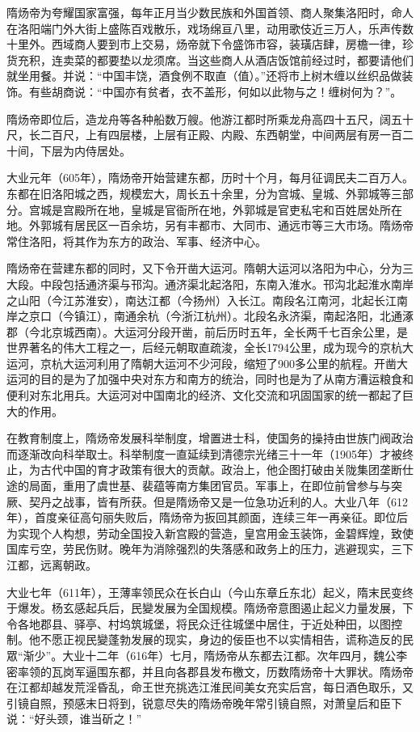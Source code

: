 隋炀帝为夸耀国家富强，每年正月当少数民族和外国首领、商人聚集洛阳时，命人在洛阳端门外大街上盛陈百戏散乐，戏场绵亘八里，动用歌伎近三万人，乐声传数十里外。西域商人要到市上交易，炀帝就下令盛饰市容，装璜店肆，房檐一律，珍货充积，连卖菜的都要垫以龙须席。当这些商人从酒店饭馆前经过时，都要请他们就坐用餐。并说：“中国丰饶，酒食例不取直（值）。”还将市上树木缠以丝织品做装饰。有些胡商说：“中国亦有贫者，衣不盖形，何如以此物与之！缠树何为？”。

隋炀帝即位后，造龙舟等各种船数万艘。他游江都时所乘龙舟高四十五尺，阔五十尺，长二百尺，上有四层楼，上层有正殿、内殿、东西朝堂，中间两层有房一百二十间，下层为内侍居处。

大业元年（605年），隋炀帝开始营建东都，历时十个月，每月征调民夫二百万人。东都在旧洛阳城之西，规模宏大，周长五十余里，分为宫城、皇城、外郭城等三部分。宫城是宫殿所在地，皇城是官衙所在地，外郭城是官吏私宅和百姓居处所在地。外郭城有居民区一百余坊，另有丰都市、大同市、通远市等三大市场。隋炀帝常住洛阳，将其作为东方的政治、军事、经济中心。

隋炀帝在营建东都的同时，又下令开凿大运河。隋朝大运河以洛阳为中心，分为三大段。中段包括通济渠与邗沟。通济渠北起洛阳，东南入淮水。邗沟北起淮水南岸之山阳（今江苏淮安），南达江都（今扬州）入长江。南段名江南河，北起长江南岸之京口（今镇江），南通余杭（今浙江杭州）。北段名永济渠，南起洛阳，北通涿郡（今北京城西南）。大运河分段开凿，前后历时五年，全长两千七百余公里，是世界著名的伟大工程之一，后经元朝取直疏浚，全长1794公里，成为现今的京杭大运河，京杭大运河利用了隋朝大运河不少河段，缩短了900多公里的航程。开凿大运河的目的是为了加强中央对东方和南方的统治，同时也是为了从南方漕运粮食和便利对东北用兵。大运河对中国南北的经济、文化交流和巩固国家的统一都起了巨大的作用。

在教育制度上，隋炀帝发展科举制度，增置进士科，使国务的操持由世族门阀政治而逐渐改向科举取士。科举制度一直延续到清德宗光绪三十一年（1905年）才被终止，为古代中国的育才政策有很大的贡献。政治上，他企图打破由关陇集团垄断仕途的局面，重用了虞世基、裴蕴等南方集团官员。军事上，在即位前曾参与与突厥、契丹之战事，皆有所获。但是隋炀帝又是一位急功近利的人。大业八年（612年），首度亲征高句丽失败后，隋炀帝为扳回其颜面，连续三年一再亲征。即位后为实现个人构想，劳动全国投入新宫殿的营造，皇宫用金玉装饰，金碧辉煌，致使国库亏空，劳民伤财。晚年为消除强烈的失落感和政务上的压力，逃避现实，三下江都，远离朝政。

大业七年（611年），王薄率领民众在长白山（今山东章丘东北）起义，隋末民变终于爆发。杨玄感起兵后，民變发展为全国规模。隋炀帝意图遏止起义力量发展，下令各地郡县、驿亭、村坞筑城堡，将民众迁往城堡中居住，于近处种田，以图控制。他不愿正视民變蓬勃发展的现实，身边的佞臣也不以实情相告，谎称造反的民眾“渐少”。大业十二年（616年）七月，隋炀帝从东都去江都。次年四月，魏公李密率领的瓦岗军逼围东都，并且向各郡县发布檄文，历数隋炀帝十大罪状。隋炀帝在江都却越发荒淫昏乱，命王世充挑选江淮民间美女充实后宫，每日酒色取乐，又引镜自照，预感末日将到，锐意尽失的隋炀帝晚年常引镜自照，对萧皇后和臣下说：“好头颈，谁当斫之！”

